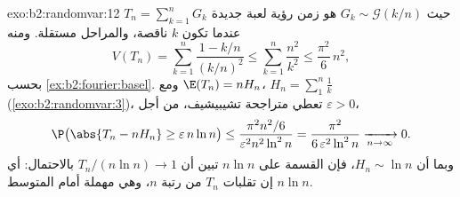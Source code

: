 \begin{solution}{exo:b2:randomvar:12}
$T_n = \sum_{k=1}^nG_k$ حيث $G_k \sim \mathcal G(k/n)$ هو زمن رؤية لعبة جديدة عندما تكون $k$ ناقصة،
والمراحل مستقلة. ومنه
\[
V(T_n) = \sum_{k=1}^n\frac{1 - k/n}{(k/n)^2}
\leq \sum_{k=1}^n\frac{n^2}{k^2}
\leq \frac{\pi^2}6\,n^2 ,
\]
بحسب \cref{ex:b2:fourier:basel}. ومع $\E(T_n) = nH_n$، $H_n =
\sum_1^n\frac1k$ (\cref{exo:b2:randomvar:3})، تعطي متراجحة تشيبيشيف،
من أجل $\varepsilon > 0$،
\[
\P\bigl(\abs{T_n - nH_n} \geq \varepsilon\,n\ln n\bigr)
\leq \frac{\pi^2n^2/6}{\varepsilon^2n^2\ln^2 n}
= \frac{\pi^2}{6\,\varepsilon^2\ln^2n}
\xrightarrow[n\to\infty]{} 0 .
\]
وبما أن $H_n \sim \ln n$، فإن القسمة على $n\ln n$ تبين أن $T_n/(n\ln n) \to 1$ بالاحتمال:
أي إن تقلبات $T_n$ من رتبة $n$، وهي مهملة أمام المتوسط $n\ln n$.
\end{solution}


